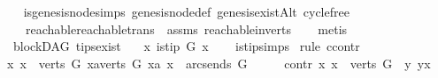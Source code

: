 \begin{isabellebody}
\ \ %
\endisadelimproof
%
\isatagproof
{}\isamarkupfalse%
\ is{\isacharunderscore}{\kern0pt}genesis{\isacharunderscore}{\kern0pt}node{\isachardot}{\kern0pt}simps\ genesis{\isacharunderscore}{\kern0pt}node{\isacharunderscore}{\kern0pt}def\ genesis{\isacharunderscore}{\kern0pt}existAlt\ cycle{\isacharunderscore}{\kern0pt}free\ \isanewline
\ \ \ \ reachable{}{\isacharunderscore}{\kern0pt}reachable{\isacharunderscore}{\kern0pt}trans\ \ assms\ reachable{}{\isacharunderscore}{\kern0pt}in{\isacharunderscore}{\kern0pt}verts{\isacharparenleft}{\kern0pt}{}{\isacharparenright}{\kern0pt}\isanewline
\ \ \isamarkupfalse%
\ {\isacharparenleft}{\kern0pt}metis{\isacharparenright}{\kern0pt}%
\endisatagproof
{\isafoldproof}%
%
\isadelimproof
%
\endisadelimproof
%
\isadelimdocument
%
\endisadelimdocument
%
\isatagdocument
%
\isamarkuptrue%
%
\endisatagdocument
{\isafolddocument}%
%
\isadelimdocument
%
\endisadelimdocument
{}\isamarkupfalse%
\ {\isacharparenleft}{\kern0pt}\ blockDAG{\isacharparenright}{\kern0pt}\ tips{\isacharunderscore}{\kern0pt}exist{\isacharcolon}{\kern0pt}\ \isanewline
\ \ {\isachardoublequoteopen}{\isasymexists}x{\isachardot}{\kern0pt}\ is{\isacharunderscore}{\kern0pt}tip\ G\ x{\isachardoublequoteclose}\isanewline
%
\isadelimproof
\ \ %
\endisadelimproof
%
\isatagproof
{}\isamarkupfalse%
\ is{\isacharunderscore}{\kern0pt}tip{\isachardot}{\kern0pt}simps\isanewline
{}\isamarkupfalse%
\ {\isacharparenleft}{\kern0pt}rule\ ccontr{\isacharparenright}{\kern0pt}\isanewline
\ \ \isamarkupfalse%
\ {\isachardoublequoteopen}{\isasymnexists}x{\isachardot}{\kern0pt}\ x\ {\isasymin}\ verts\ G\ {\isasymand}{\isacharparenleft}{\kern0pt}{\isasymforall}xa{\isasymin}verts\ G{\isachardot}{\kern0pt}\ {\isacharparenleft}{\kern0pt}xa{\isacharcomma}{\kern0pt}\ x{\isacharparenright}{\kern0pt}\ {\isasymnotin}\ {\isacharparenleft}{\kern0pt}arcs{\isacharunderscore}{\kern0pt}ends\ G{\isacharparenright}{\kern0pt}\isactrlsup {\isacharplus}{\kern0pt}{\isacharparenright}{\kern0pt}{\isachardoublequoteclose}\isanewline
\ \ \isamarkupfalse%
\ \isamarkupfalse%
\ contr{\isacharcolon}{\kern0pt}\ {\isachardoublequoteopen}{\isasymforall}x{\isachardot}{\kern0pt}\ x\ {\isasymin}\ verts\ G\ {\isasymlongrightarrow}\ {\isacharparenleft}{\kern0pt}{\isasymexists}y{\isachardot}{\kern0pt}\ y{\isasymrightarrow}\isactrlsup {\isacharplus}{\kern0pt}x{\isacharparenright}{\kern0pt}{\isachardoublequoteclose}\isanewline

\end{isabellebody}
